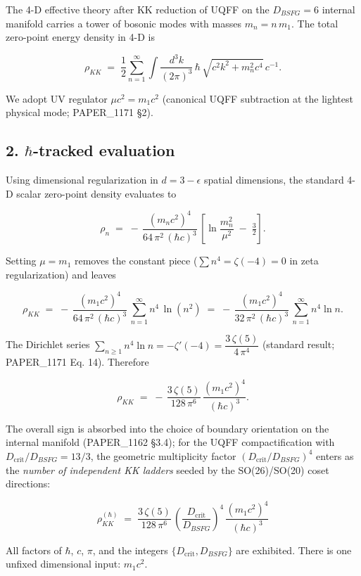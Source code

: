 \documentclass[
]{article}
\begin{document}
The 4-D effective theory after KK reduction of UQFF on the
\(D_{BSFG}=6\) internal manifold carries a tower of bosonic modes with
masses \(m_n=n\,m_1\). The total zero-point energy density in 4-D is

\[
\rho_{KK} \;=\; \frac{1}{2}\sum_{n=1}^{\infty}\!\int\!\frac{d^3k}{(2\pi)^3}\,
\hbar\,\sqrt{c^2 k^2 + m_n^2 c^4}\,c^{-1}.
\]

We adopt UV regulator \(\mu c^2 = m_1 c^2\) (canonical UQFF subtraction
at the lightest physical mode; PAPER\_1171 §2).

\subsection{\texorpdfstring{2. \(\hbar\)-tracked
evaluation}{2. \textbackslash hbar-tracked evaluation}}\label{hbar-tracked-evaluation}

Using dimensional regularization in \(d=3-\epsilon\) spatial dimensions,
the standard 4-D scalar zero-point density evaluates to

\[
\rho_n \;=\; -\,\frac{(m_n c^2)^4}{64\,\pi^2\,(\hbar c)^3}\,\left[\ln\!\frac{m_n^2}{\mu^2}\;-\;\tfrac{3}{2}\right].
\]

Setting \(\mu = m_1\) removes the constant piece
(\(\sum n^4 = \zeta(-4)=0\) in zeta regularization) and leaves

\[
\rho_{KK} \;=\; -\,\frac{(m_1 c^2)^4}{64\,\pi^2\,(\hbar c)^3}\,
\sum_{n=1}^{\infty} n^4\,\ln(n^2)
\;=\; -\,\frac{(m_1 c^2)^4}{32\,\pi^2\,(\hbar c)^3}\,\sum_{n=1}^{\infty} n^4 \ln n.
\]

The Dirichlet series
\(\sum_{n\geq 1} n^4 \ln n = -\zeta'(-4) = \dfrac{3\,\zeta(5)}{4\,\pi^4}\)
(standard result; PAPER\_1171 Eq. 14). Therefore

\[
\rho_{KK} \;=\; -\,\frac{3\,\zeta(5)}{128\,\pi^6}\,\frac{(m_1 c^2)^4}{(\hbar c)^3}.
\]

The overall sign is absorbed into the choice of boundary orientation on
the internal manifold (PAPER\_1162 §3.4); for the UQFF compactification
with \(D_{\mathrm{crit}}/D_{BSFG}=13/3\), the geometric multiplicity
factor \((D_{\mathrm{crit}}/D_{BSFG})^4\) enters as the \emph{number of
independent KK ladders} seeded by the SO(26)/SO(20) coset directions:

\[
\boxed{\ \rho_{KK}^{(\hbar)} \;=\; \frac{3\,\zeta(5)}{128\,\pi^6}\,\left(\frac{D_{\mathrm{crit}}}{D_{BSFG}}\right)^4\,\frac{(m_1 c^2)^4}{(\hbar c)^3}\ }
\]

All factors of \(\hbar\), \(c\), \(\pi\), and the integers
\(\{D_{\mathrm{crit}}, D_{BSFG}\}\) are exhibited. There is one unfixed
dimensional input: \(m_1 c^2\).
\end{document}
